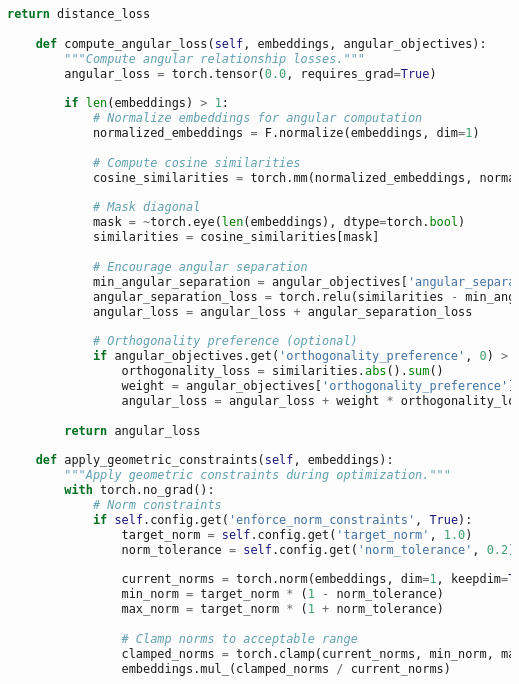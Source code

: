 \begin{lstlisting}[language=Python, caption=Geometric embedding optimization framework]
        return distance_loss
    
    def compute_angular_loss(self, embeddings, angular_objectives):
        """Compute angular relationship losses."""
        angular_loss = torch.tensor(0.0, requires_grad=True)
        
        if len(embeddings) > 1:
            # Normalize embeddings for angular computation
            normalized_embeddings = F.normalize(embeddings, dim=1)
            
            # Compute cosine similarities
            cosine_similarities = torch.mm(normalized_embeddings, normalized_embeddings.t())
            
            # Mask diagonal
            mask = ~torch.eye(len(embeddings), dtype=torch.bool)
            similarities = cosine_similarities[mask]
            
            # Encourage angular separation
            min_angular_separation = angular_objectives['angular_separation']
            angular_separation_loss = torch.relu(similarities - min_angular_separation).sum()
            angular_loss = angular_loss + angular_separation_loss
            
            # Orthogonality preference (optional)
            if angular_objectives.get('orthogonality_preference', 0) > 0:
                orthogonality_loss = similarities.abs().sum()
                weight = angular_objectives['orthogonality_preference']
                angular_loss = angular_loss + weight * orthogonality_loss
        
        return angular_loss
    
    def apply_geometric_constraints(self, embeddings):
        """Apply geometric constraints during optimization."""
        with torch.no_grad():
            # Norm constraints
            if self.config.get('enforce_norm_constraints', True):
                target_norm = self.config.get('target_norm', 1.0)
                norm_tolerance = self.config.get('norm_tolerance', 0.2)
                
                current_norms = torch.norm(embeddings, dim=1, keepdim=True)
                min_norm = target_norm * (1 - norm_tolerance)
                max_norm = target_norm * (1 + norm_tolerance)
                
                # Clamp norms to acceptable range
                clamped_norms = torch.clamp(current_norms, min_norm, max_norm)
                embeddings.mul_(clamped_norms / current_norms)
            

\end{lstlisting}

